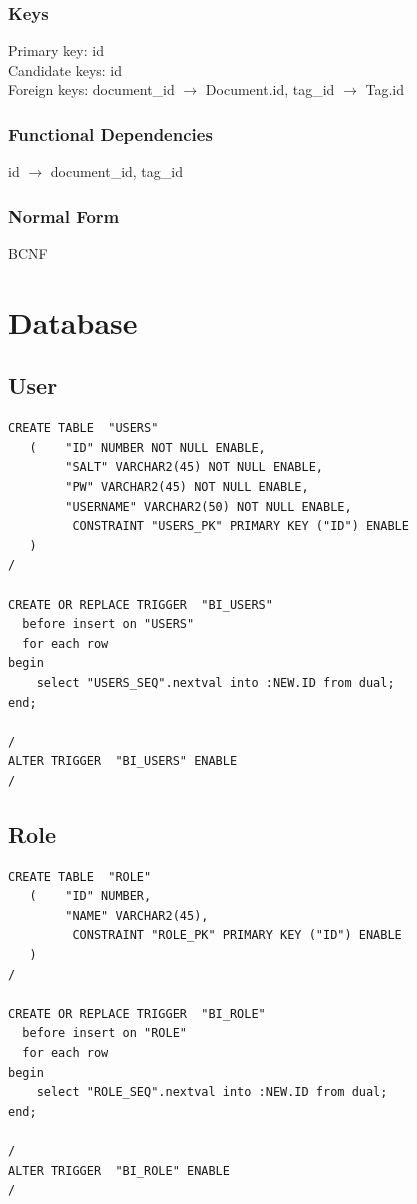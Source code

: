 \documentclass[11pt]{article}
\begin{document}
   
\subsubsection{Keys}
\label{sec-3-11-1}

    
    Primary key: id\\
    Candidate keys: id\\
    Foreign keys: document\_id $\rightarrow$ Document.id, tag\_id $\rightarrow$ Tag.id
\subsubsection{Functional Dependencies}
\label{sec-3-11-2}

    
    id $\rightarrow$ document\_id, tag\_id
\subsubsection{Normal Form}
\label{sec-3-11-3}


    BCNF
    
\section{Database}
\label{sec-4}

  
\subsection{User}
\label{sec-4-1}



\begin{verbatim}
CREATE TABLE  "USERS" 
   (    "ID" NUMBER NOT NULL ENABLE, 
        "SALT" VARCHAR2(45) NOT NULL ENABLE, 
        "PW" VARCHAR2(45) NOT NULL ENABLE, 
        "USERNAME" VARCHAR2(50) NOT NULL ENABLE, 
         CONSTRAINT "USERS_PK" PRIMARY KEY ("ID") ENABLE
   )
/

CREATE OR REPLACE TRIGGER  "BI_USERS" 
  before insert on "USERS"               
  for each row  
begin   
    select "USERS_SEQ".nextval into :NEW.ID from dual; 
end; 

/
ALTER TRIGGER  "BI_USERS" ENABLE
/
\end{verbatim}
\subsection{Role}
\label{sec-4-2}



\begin{verbatim}
CREATE TABLE  "ROLE" 
   (    "ID" NUMBER, 
        "NAME" VARCHAR2(45), 
         CONSTRAINT "ROLE_PK" PRIMARY KEY ("ID") ENABLE
   )
/

CREATE OR REPLACE TRIGGER  "BI_ROLE" 
  before insert on "ROLE"               
  for each row  
begin   
    select "ROLE_SEQ".nextval into :NEW.ID from dual; 
end; 

/
ALTER TRIGGER  "BI_ROLE" ENABLE
/
\end{verbatim}
\end{document}
